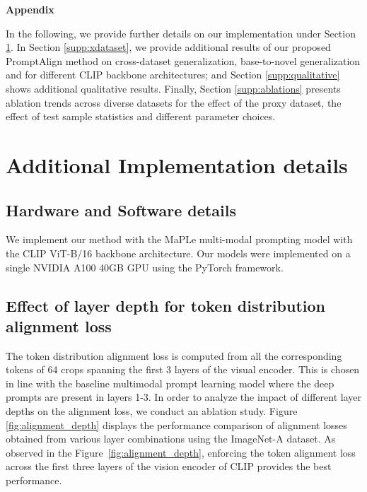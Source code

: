 
\appendix

\noindent\begin{LARGE} \textbf{Appendix} \vspace{4mm} \end{LARGE}

In the following, we provide further details on our implementation under Section \ref{supp:implementaions}. In Section \ref{supp:xdataset}, we provide additional results of our proposed PromptAlign method on cross-dataset generalization, base-to-novel generalization and for different CLIP backbone architectures; and Section \ref{supp:qualitative} shows additional qualitative results. Finally, Section \ref{supp:ablations} presents ablation trends across diverse datasets for the effect of the proxy dataset, the effect of test sample statistics and different parameter choices.


\section{Additional Implementation details}
\label{supp:implementaions}


\subsection{Hardware and Software details}
We implement our method with the MaPLe \cite{khattakMaPLe} multi-modal prompting model with the CLIP ViT-B/16 backbone architecture. Our models were implemented on a single NVIDIA A100 40GB GPU using the PyTorch framework.


\subsection{Effect of layer depth for token distribution alignment loss}
The token distribution alignment loss is computed from all the corresponding tokens of 64 crops spanning the first 3 layers of the visual encoder. This is chosen in line with the baseline multimodal prompt learning model \cite{khattakMaPLe} where the deep prompts are present in layers 1-3. In order to analyze the impact of different layer depths on the alignment loss, we conduct an ablation study. Figure \ref{fig:alignment_depth} displays the performance comparison of alignment losses obtained from various layer combinations using the ImageNet-A dataset. As observed in the Figure~\ref{fig:alignment_depth}, enforcing the token alignment loss across the first three layers of the vision encoder of CLIP provides the best performance.

